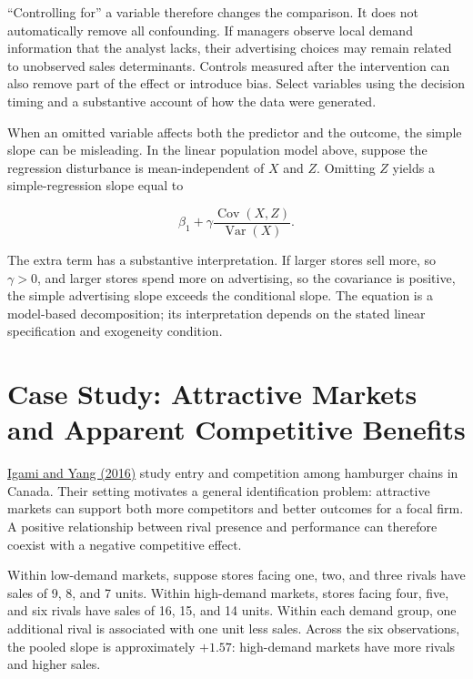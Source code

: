 ``Controlling for'' a variable therefore changes the comparison. It does
not automatically remove all confounding. If managers observe local
demand information that the analyst lacks, their advertising choices may
remain related to unobserved sales determinants. Controls measured after
the intervention can also remove part of the effect or introduce bias.
Select variables using the decision timing and a substantive account of
how the data were generated.

When an omitted variable affects both the predictor and the outcome, the
simple slope can be misleading. In the linear population model above,
suppose the regression disturbance is mean-independent of \(X\) and
\(Z\). Omitting \(Z\) yields a simple-regression slope equal to

\[
\beta_1+\gamma\frac{\operatorname{Cov}(X,Z)}{\operatorname{Var}(X)}.
\]

The extra term has a substantive interpretation. If larger stores sell
more, so \(\gamma>0\), and larger stores spend more on advertising, so
the covariance is positive, the simple advertising slope exceeds the
conditional slope. The equation is a model-based decomposition; its
interpretation depends on the stated linear specification and exogeneity
condition.

\hypertarget{M03-case-study-attractive-markets-and-apparent-competitive-benefits}{%
\section{Case Study: Attractive Markets and Apparent Competitive
Benefits}\label{M03-case-study-attractive-markets-and-apparent-competitive-benefits}}

\noindent \href{https://doi.org/10.3982/QE478}{Igami and Yang (2016)} study entry
and competition among hamburger chains in Canada. Their setting
motivates a general identification problem: attractive markets can
support both more competitors and better outcomes for a focal firm. A
positive relationship between rival presence and performance can
therefore coexist with a negative competitive effect.

Within low-demand markets, suppose stores facing one, two, and three
rivals have sales of 9, 8, and 7 units. Within high-demand markets,
stores facing four, five, and six rivals have sales of 16, 15, and 14
units. Within each demand group, one additional rival is associated with
one unit less sales. Across the six observations, the pooled slope is
approximately \(+1.57\): high-demand markets have more rivals and higher
sales.

